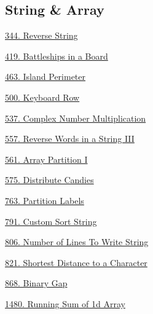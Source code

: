 \subsection*{String \& Array}
\begin{flushleft}
    \hyperref[algo:344]{344. Reverse String}

    \hyperref[algo:419]{419. Battleships in a Board}
    
    \hyperref[algo:463]{463. Island Perimeter}

    \hyperref[algo:500]{500. Keyboard Row}

    \hyperref[algo:537]{537. Complex Number Multiplication}

    \hyperref[algo:557]{557. Reverse Words in a String III}

    \hyperref[algo:561]{561. Array Partition I}

    \hyperref[algo:575]{575. Distribute Candies}

    \hyperref[algo:763]{763. Partition Labels}

    \hyperref[algo:791]{791. Custom Sort String}

    \hyperref[algo:806]{806. Number of Lines To Write String}

    \hyperref[algo:821]{821. Shortest Distance to a Character}
    
    \hyperref[algo:868]{868. Binary Gap}

    \hyperref[algo:1480]{1480. Running Sum of 1d Array}
\end{flushleft}
